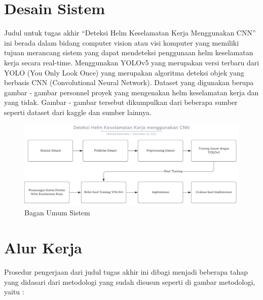 
\section{Desain Sistem}
\label{sec:desainsistem}

Judul untuk tugas akhir “Deteksi Helm Keselamatan Kerja Menggunakan CNN” ini berada dalam bidang computer vision atau visi komputer yang memiliki tujuan merancang sistem yang dapat mendeteksi penggunaan helm keselamatan kerja secara real-time. Menggunakan YOLOv5 yang merupakan versi terbaru dari YOLO (You Only Look Once) yang merupakan algoritma deteksi objek yang berbasis CNN (Convolutional Neural Network). Dataset yang digunakan berupa gambar - gambar personnel proyek yang mengenakan helm keselamatan kerja dan yang tidak. Gambar - gambar tersebut dikumpulkan dari beberapa sumber seperti dataset dari kaggle dan sumber lainnya.

\begin{figure}[ht]
  \centering
  \includegraphics[scale=0.7]{gambar/Metodologi CNN.png}
  \caption{Bagan Umum Sistem}
  \label{fig:baganumumsistem}  
\end{figure}

\section{Alur Kerja}
\label{sec:alurkerja}

Prosedur pengerjaan dari judul tugas akhir ini dibagi menjadi beberapa tahap yang didasari dari metodologi yang sudah disusun seperti di gambar metodologi, yaitu :

